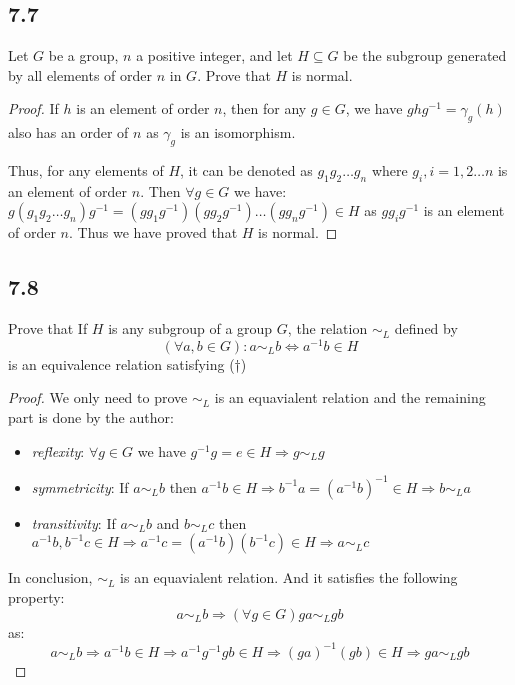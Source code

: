 \documentclass[a4paper, pdf, 12pt]{article}
\begin{document}
\subsection*{7.7}
Let $G$ be a group, $n$ a positive integer, and let $H \subseteq G$ be the subgroup
generated by all elements of order $n$ in $G$. Prove that $H$ is normal.

\begin{proof}
  If $h$ is an element of order $n$, then for any $g\in G$, we have $ghg^{-1} = \gamma_{g}(h)$ also has an order 
  of $n$ as $\gamma_{g}$ is an isomorphism.

  Thus, for any elements of $H$, it can be denoted as $g_1g_2\dots g_n$ where $g_i, i=1,2\ldots n$  is 
  an element of order $n$. Then $\forall g\in G$ we have:
  $g(g_1g_2\dots g_n)g^{-1} = (gg_1g^{-1})(gg_2g^{-1})\dots (gg_ng^{-1})\in H$ as 
  $gg_{i}g^{-1}$ is an element of order $n$. Thus we have proved that $H$ is normal.
\end{proof}

\subsection*{7.8}
Prove that 
If $H$ is any subgroup of a group $G$, the relation $\sim_{L}$ defined by
$$
(\forall a, b \in G): a \sim_{L} b \Longleftrightarrow a^{-1}b\in H
$$
is an equivalence relation satisfying (†)

\begin{proof}
  We only need to prove $\sim_{L}$ is an equavialent relation and the remaining part is
  done by the author:
  \begin{itemize}
    \item \textit{reflexity}: $\forall g\in G$ we have $g^{-1}g = e\in H\Rightarrow g\sim_{L}g$
    \item \textit{symmetricity}: If $a\sim_{L}b$ then $a^{-1}b\in H\Rightarrow b^{-1}a = (a^{-1}b)^{-1}\in H\Rightarrow b\sim_{L}a$
    \item \textit{transitivity}: If $a\sim_{L}b$ and $b\sim_{L}c$ then $a^{-1}b, b^{-1}c\in H\Rightarrow a^{-1}c = (a^{-1}b)(b^{-1}c)\in H\Rightarrow a\sim_{L}c$
  \end{itemize}
  In conclusion, $\sim_{L}$ is an equavialent relation. And it satisfies the following property:
  $$
  a\sim_{L} b\Rightarrow (\forall g\in G)ga\sim_{L} gb 
  $$
  as:
  $$
  a\sim_{L}b\Rightarrow a^{-1}b\in H\Rightarrow a^{-1}g^{-1}gb\in H\Rightarrow (ga)^{-1}(gb)\in H\Rightarrow ga\sim_{L} gb
  $$
\end{proof}
\end{document}
